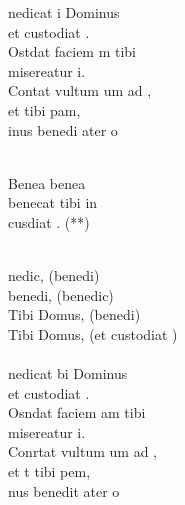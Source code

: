 \begin{cancion}[Benedicat][]%
	nedicat i Dominus \\
	et custodiat .\\
	Ostdat faciem m tibi\\
	 misereatur i.\\
	Contat vultum um ad ,\\
	et  tibi pam,\\
	inus benedi ater o \\\jump\\
	\begin{chorus}%
	Benea benea \\
	benecat tibi in\\
	 cusdiat . (**)\\
	\end{chorus}%
	\jump\\
	nedic, (benedi)\\
	benedi, (benedic)\\
	Tibi Domus, (benedi)\\
	Tibi Domus, (et custodiat )\\
\jump\\
	nedicat bi Dominus\\
	et custodiat .\\
	Osndat faciem am tibi\\
	 misereatur i.\\
	Conrtat vultum um ad ,\\
	et t tibi pem,\\
	nus benedit ater o \\\jump\\

\end{cancion}
